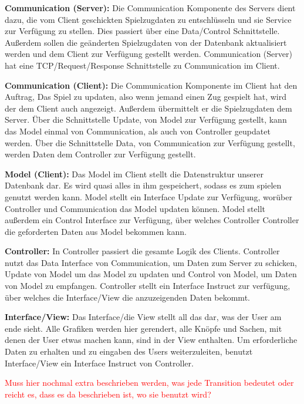 \documentclass[fontsize=12pt,paper=a4,twoside]{scrartcl}
\begin{document}
\textbf{Communication (Server):}
Die Communication Komponente des Servers dient dazu, die vom Client geschickten Spielzugdaten zu entschlüsseln und sie Service zur Verfügung zu stellen. Dies passiert über eine Data/Control Schnittstelle. Außerdem sollen die geänderten Spielzugdaten von der Datenbank aktualisiert werden und dem Client zur Verfügung gestellt werden. Communication (Server) hat eine TCP/Request/Response Schnittstelle zu Communication im Client. 

\textbf{Communication (Client):}
Die Communication Komponente im Client hat den Auftrag, Das Spiel zu updaten, also wenn jemand einen Zug gespielt hat, wird der dem Client auch angezeigt. Außerdem übermittelt er die Spielzugdaten dem Server. Über die Schnittstelle Update, von Model zur Verfügung gestellt, kann das Model einmal von Communication, als auch von Controller geupdatet werden. Über die Schnittstelle Data, von Communication zur Verfügung gestellt, werden Daten dem Controller zur Verfügung gestellt.

\textbf{Model (Client):}
Das Model im Client stellt die Datenstruktur unserer Datenbank dar. Es wird quasi alles in ihm gespeichert, sodass es zum spielen genutzt werden kann. Model stellt ein Interface Update zur Verfügung, worüber Controller und Communication das Model updaten können. Model stellt außerdem ein Control Interface zur Verfügung, über welches Controller Controller die geforderten Daten aus Model bekommen kann. 

\textbf{Controller:}
In Controller passiert die gesamte Logik des Clients. Controller nutzt das Data Interface von Communication, um Daten zum Server zu schicken, Update von Model um das Model zu updaten und Control von Model, um Daten von Model zu empfangen. Controller stellt ein Interface Instruct zur verfügung, über welches die Interface/View die anzuzeigenden Daten bekommt. 

\textbf{Interface/View:}
Das Interface/die View stellt all das dar, was der User am ende sieht. Alle Grafiken werden hier gerendert, alle Knöpfe und Sachen, mit denen der User etwas machen kann, sind in der View enthalten. Um erforderliche Daten zu erhalten und zu eingaben des Users weiterzuleiten, benutzt Interface/View ein Interface Instruct von Controller. 

\textcolor{red}{Muss hier nochmal extra beschrieben werden, was jede Transition bedeutet oder reicht es, dass es da beschrieben ist, wo sie benutzt wird?}


\newpage
\end{document}

